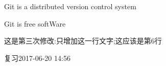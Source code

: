 Git is a distributed  version control system

Git is free softWare


这是第三次修改:只增加这一行文字;这应该是第6行


复习2017-06-20 14:56



